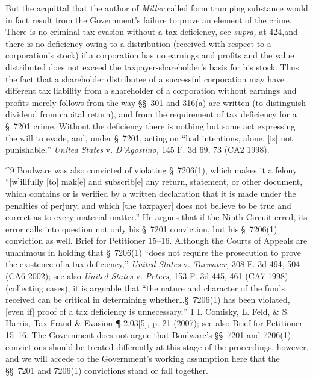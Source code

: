   But the acquittal that the author of \emph{Miller} called form trumping
substance would in fact result from the Government's failure to prove
an element of the crime. There is no criminal tax evasion without
a tax deficiency, see \emph{supra,} at 424,\footnotemark[9] and there is no
deficiency owing to a distribution (re\newpage ceived with respect to a
corporation's stock) if a corporation has no earnings and profits
and the value distributed does not exceed the taxpayer-shareholder's
basis for his stock. Thus the fact that a shareholder distributee
of a successful corporation may have different tax liability from a
shareholder of a corporation without earnings and profits merely follows
from the way \S\S~301 and 316(a) are written (to distinguish dividend
from capital return), and from the requirement of tax deficiency for a
\S~7201 crime. Without the deficiency there is nothing but some act
expressing the will to evade, and, under \S~7201, acting on ``bad
intentions, alone, [is] not punishable,'' \emph{United States} v.
\emph{D'Agostino,} 145 F. 3d 69, 73 (CA2 1998).

^9 Boulware was also convicted of violating \S~7206(1), which makes
it a felony ``[w]illfully [to] mak[e] and subscrib[e] any return,
statement, or other document, which contains or is verified by a written
declaration that it is made under the penalties of perjury, and which
[the taxpayer] does not believe to be true and correct as to every
material matter.'' He argues that if the Ninth Circuit erred, its
error calls into question not only his \S~7201 conviction, but his
\S~7206(1) conviction as well. Brief for Petitioner 15--16.
Although the Courts of Appeals are unanimous in holding that \S~7206(1)
``does not require the prosecution to prove the existence of \newpage  a
tax deficiency,'' \emph{United States} v. \emph{Tarwater,} 308 F. 3d 494,
504 (CA6 2002); see also \emph{United States} v. \emph{Peters,} 153 F. 3d 445,
461 (CA7 1998) (collecting cases), it is arguable that ``the nature
and character of the funds received can be critical in determining
whether\dots \S~7206(1) has been violated, [even if] proof of a tax
deficiency is unnecessary,'' 1 I. Comisky, L. Feld, \& S. Harris, Tax
Fraud \& Evasion ¶ 2.03[5], p. 21 (2007); see also Brief for Petitioner
15--16. The Government does not argue that Boulware's \S\S~7201
and 7206(1) convictions should be treated differently at this stage
of the proceedings, however, and we will accede to the Government's
working assumption here that the \S\S~7201 and 7206(1) convictions
stand or fall together.

